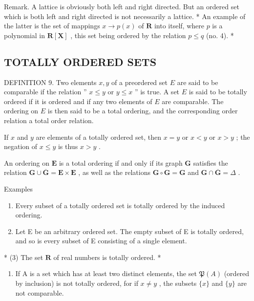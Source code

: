 Remark. A lattice is obviously both left and right directed. But an ordered set which is both left and right directed is not necessarily a lattice. * An example of the latter is the set of mappings \(x \to p(x)\) of \(\mathbf{R}\) into itself, where \(p\) is a polynomial in \(\mathbf{R}[\mathbf{X}]\) , this set being ordered by the relation \(p \leqslant q\) (no. 4). *

\subsection{TOTALLY ORDERED SETS}

DEFINITION 9. Two elements \(x, y\) of a preordered set \(E\) are said to be comparable if the relation '' \(x \leqslant y\) or \(y \leqslant x\) '' is true. A set \(E\) is said to be totally ordered if it is ordered and if any two elements of \(E\) are comparable. The ordering on \(E\) is then said to be a total ordering, and the corresponding order relation a total order relation.

If \(x\) and \(y\) are elements of a totally ordered set, then \(x = y\) or \(x < y\) or \(x > y\) ; the negation of \(x \leqslant y\) is thus \(x > y\) .

An ordering on \(\mathbf{E}\) is a total ordering if and only if its graph \(\mathbf{G}\) satisfies the relation \(\mathbf{G} \cup \overline{\mathbf{G}} = \mathbf{E} \times \mathbf{E}\) , as well as the relations \(\mathbf{G} \circ \mathbf{G} = \mathbf{G}\) and \(\mathbf{G} \cap \overline{\mathbf{G}} = \Delta\) .

Examples

\begin{enumerate}
\def\labelenumi{(\arabic{enumi})}
\item
  Every subset of a totally ordered set is totally ordered by the induced ordering.
\item
  Let E be an arbitrary ordered set. The empty subset of E is totally ordered, and so is every subset of E consisting of a single element.
\end{enumerate}

* (3) The set \(\mathbf{R}\) of real numbers is totally ordered. *

\begin{enumerate}
\def\labelenumi{(\arabic{enumi})}
\setcounter{enumi}{3}
\tightlist
\item
  If A is a set which has at least two distinct elements, the set \(\mathfrak{P}(A)\) (ordered by inclusion) is not totally ordered, for if \(x \neq y\) , the subsets \(\{x\}\) and \(\{y\}\) are not comparable.
\end{enumerate}

